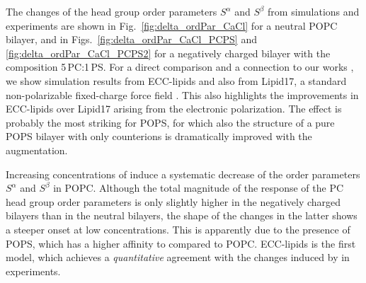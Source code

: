 \documentclass[12pt,a4paper,twoside,openright]{report}
\begin{document}
 




The changes of the head group order parameters $S^\alpha$ and $S^\beta$ from simulations and experiments 
are shown in Fig.~\ref{fig:delta_ordPar_CaCl} for a neutral POPC bilayer, 
and in Figs.~\ref{fig:delta_ordPar_CaCl_PCPS} and \ref{fig:delta_ordPar_CaCl_PCPS2} for a negatively charged bilayer with the composition 5\,PC:1\,PS. 
For a direct comparison and a connection to our works \citep{catte16, nmrlipids_proj4},
we show simulation results from ECC-lipids and also from Lipid17, a standard non-polarizable fixed-charge force field \citep{lipid17-future}. 
This also highlights the improvements in ECC-lipids over Lipid17 arising from the electronic polarization. 
The effect is probably the most striking for POPS, 
for which also the structure of a pure POPS bilayer with only counterions is dramatically improved with the augmentation. 


Increasing concentrations of  induce a systematic decrease of the order parameters $S^\alpha$ and $S^\beta$ in POPC. 
Although the total magnitude of the response of the PC head group order parameters 
is only slightly higher in the negatively charged bilayers than in the neutral bilayers, 
the shape of the changes in the latter shows a steeper onset at low concentrations. 
This is apparently due to the presence of POPS, 
which has a higher affinity to  compared to POPC. 
ECC-lipids is the first model,
which achieves a \emph{quantitative} agreement with the changes induced by  in experiments. 
\end{document}
